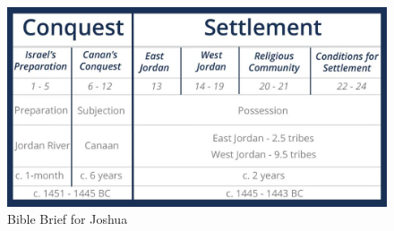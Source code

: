 

\newpage
\begin{figure}
\begin{center}
\includegraphics[scale=.5, angle=90]{06OT-Joshua/References/10.Bible-Brief-Joshua.jpg}
\caption[Bible Brief for Joshua]{Bible Brief for Joshua}
\label{fig:Bible Brief for Joshua}
\end{center}
\end{figure}

